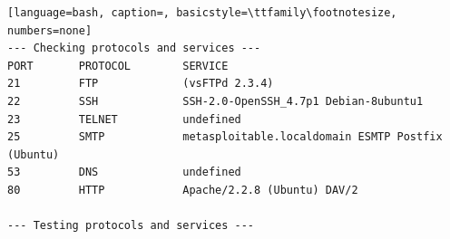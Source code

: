 \documentclass[12pt]{report}
\begin{document}
\begin{lstlisting}[language=bash, caption=, basicstyle=\ttfamily\footnotesize, numbers=none]
--- Checking protocols and services ---                                                                                                                                                                              
PORT       PROTOCOL        SERVICE                                                                                                                                                                                   
21         FTP             (vsFTPd 2.3.4)                                                                                                                                                                            
22         SSH             SSH-2.0-OpenSSH_4.7p1 Debian-8ubuntu1                                                                                                                                                     
23         TELNET          undefined                                                                                                                                                                                 
25         SMTP            metasploitable.localdomain ESMTP Postfix (Ubuntu)                                                                                                                                         
53         DNS             undefined                                                                                                                                                                                 
80         HTTP            Apache/2.2.8 (Ubuntu) DAV/2                                                                                                                                                               
                                                                                                                                                                                                                     
--- Testing protocols and services ---                                                                                                                                                                               
                                                                                                                                                                                                                     

\end{lstlisting}
\end{document}
